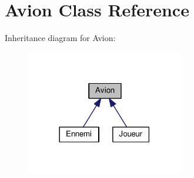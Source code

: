 \hypertarget{classAvion}{\section{Avion Class Reference}
\label{classAvion}
}


Inheritance diagram for Avion\+:
\nopagebreak
\begin{figure}[H]
\begin{center}
\leavevmode
\includegraphics[width=194pt]{classAvion__inherit__graph}
\end{center}
\end{figure}
